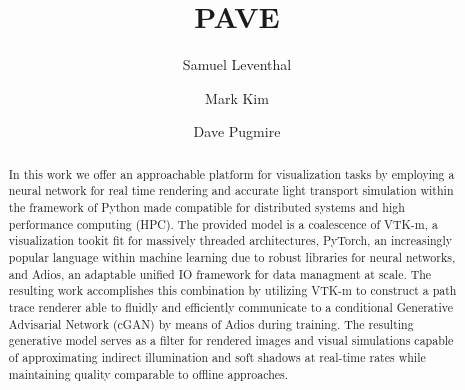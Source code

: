 \documentclass[sigconf,authordraft]{acmart}
\begin{document}
\title{PAVE}

\author{Samuel Leventhal}
\author{Mark Kim}

\author{Dave Pugmire}
\authornotemark[1]


\renewcommand{\shortauthors}{Leventhal and Kim, et al.}

\begin{abstract}
  In this work we offer an approachable platform for visualization tasks by employing a neural network for real time rendering and accurate light transport simulation within the framework of Python made compatible for distributed systems and high performance computing (HPC). The provided model is a coalescence of VTK-m, a visualization tookit fit for massively threaded architectures, PyTorch, an  increasingly popular language within machine learning due to robust libraries for neural networks, and Adios, an adaptable unified IO framework for data managment at scale. The resulting work accomplishes this combination by utilizing VTK-m to construct a path trace renderer able to fluidly and efficiently communicate to a conditional Generative Advisarial Network (cGAN) by means of Adios during training. The resulting generative model serves as a filter for rendered images and visual simulations capable of approximating indirect illumination and soft shadows at real-time rates while maintaining quality comparable to offline approaches.
\end{abstract}
\end{document}

